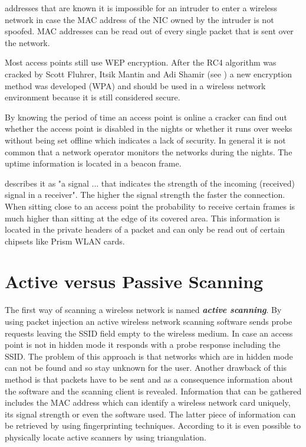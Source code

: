 \begin{description}
		addresses that are known it is impossible for an 
		intruder to enter a wireless network in case the MAC address of the 
		NIC owned by the intruder is not spoofed. MAC addresses can be read 
		out of every single packet that is sent over the network.
	\item[Encryption:]
		Most access points still use WEP encryption. After the 
		RC4 algorithm was cracked by Scott Fluhrer, Itsik 
		Mantin and Adi Shamir (see \cite{rc4weak}) a new encryption method was developed (WPA) and should be used 
		in a wireless network environment because it is still considered secure. %
	\item[Uptime:]
		By knowing the period of time an access point is online a cracker can find out 
		whether the access point is disabled in the nights or whether it 
		runs over weeks without being set offline which indicates a lack of 
		security. In general it is not common that a network operator 
		monitors the networks during the nights. The uptime information is located in a beacon frame.
	\item[Signal strength:]
		\cite{signal_strength} describes it as "a signal ... that indicates the strength of the incoming (received) signal in a receiver". The higher the signal strength the faster the connection. 
		When sitting close to an access point the probability to receive 
		certain frames is much higher than sitting at the edge of its covered area. This 
		information is located in the private headers of a packet and can only be read out of certain chipsets like Prism WLAN cards.
\end{description}

\section{Active versus Passive Scanning}
\label{sec:active_passive_scanning}

The first way of scanning a wireless network is named {\bf {\em active scanning}}. By using packet injection an active wireless network scanning software sends probe requests leaving the SSID field empty to the wireless medium. In case an access point is not in hidden mode it responds with a probe response including the SSID. The problem of this approach is that networks which are in hidden mode can not be found and so stay unknown for the user. Another drawback of this method is that packets have to be sent and as a consequence information about the software and the scanning client is revealed. Information that can be gathered includes the MAC address which can identify a wireless network card uniquely, its signal strength or even the software used. The latter piece of information can be retrieved by using fingerprinting techniques. According to \cite{triangulation} it is even possible to physically locate active scanners by using triangulation.

